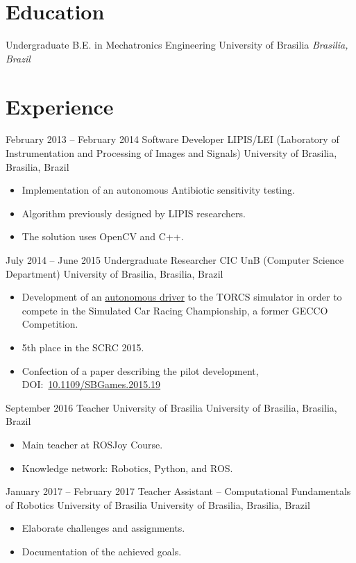 \documentclass[a4paper, 10pt]{moderncv}        %
\begin{document}
\makecvtitle
\section{Education}
\cventry
{Undergraduate}
{B.E. in Mechatronics Engineering}
{University of Brasilia}
{}
{\textit{Brasilia, Brazil}}
{}
\section{Experience}
\cventry
{February 2013 -- February 2014}
{Software Developer}
{LIPIS/LEI (Laboratory of Instrumentation and Processing of Images and Signals)}
{University of Brasilia, Brasilia, Brazil}
{}
{\begin{itemize}%
    \item Implementation of an autonomous Antibiotic sensitivity testing.
    \item Algorithm previously designed by LIPIS researchers.
    \item The solution uses OpenCV and C++.
    \end{itemize}}
\cventry
{July 2014 -- June 2015}
{Undergraduate Researcher}
{CIC UnB (Computer Science Department)}
{University of Brasilia, Brasilia, Brazil}
{}
{\begin{itemize}%
    \item Development of an \href{https://github.com/bruno147/driver-ga}{autonomous driver} to the TORCS simulator in order to compete in the Simulated Car Racing Championship, a former GECCO Competition.
    \item 5th place in the SCRC 2015.
    \item Confection of a paper describing the pilot development, DOI:~\href{https://doi.org/10.1109/SBGames.2015.19}{10.1109/SBGames.2015.19}
    \end{itemize}}
\cventry
{September 2016}
{Teacher}
{University of Brasilia}
{University of Brasilia, Brasilia, Brazil}
{}
{\begin{itemize}%
    \item Main teacher at ROSJoy Course.
    \item Knowledge network: Robotics, Python, and ROS.
    \end{itemize}}
\cventry
{January 2017 -- February 2017}
{Teacher Assistant -- Computational Fundamentals of Robotics}
{University of Brasilia}
{University of Brasilia, Brasilia, Brazil}
{}
{\begin{itemize}%
    \item Elaborate challenges and assignments.
    \item Documentation of the achieved goals.
    \end{itemize}}
\end{document}
